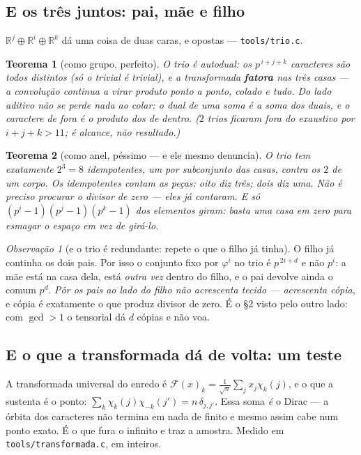 \documentclass[11pt]{article}
\newcommand{\code}[1]{\texttt{\small #1}}
\newcommand{\R}{\mathbb R}
\newcommand{\F}{\mathcal F}
\theoremstyle{plain}
\newtheorem{teorema}{Teorema}
\theoremstyle{remark}
\newtheorem{obs}{Observação}
\begin{document}
\subsection*{E os três juntos: pai, mãe e filho}

$\R^j\oplus\R^i\oplus\R^k$ dá uma coisa de duas caras, e opostas --- \code{tools/trio.c}.

\begin{teorema}[como grupo, perfeito]
O trio é autodual: os $p^{\,i+j+k}$ caracteres são todos distintos (só o trivial é trivial), e a
transformada \textbf{fatora} nas três casas --- a convolução continua a virar produto ponto a ponto,
colado e tudo. \emph{Do lado aditivo não se perde nada ao colar}: o dual de uma soma é a soma dos
duais, e o caractere de fora é o produto dos de dentro. ($2$ trios ficaram fora do exaustivo por
$i+j+k>11$; é alcance, não resultado.)
\end{teorema}

\begin{teorema}[como anel, péssimo --- e ele mesmo denuncia]
O trio tem exatamente $2^3=8$ idempotentes, um por subconjunto das casas, contra os $2$ de um corpo.
\emph{Os idempotentes contam as peças}: oito diz três; dois diz uma. Não é preciso procurar o divisor
de zero --- eles já contaram. E só $(p^i-1)(p^j-1)(p^k-1)$ dos elementos giram: basta \emph{uma} casa
em zero para esmagar o espaço em vez de girá-lo.
\end{teorema}

\begin{obs}[e o trio é redundante: repete o que o filho já tinha]
O filho já continha os dois pais. Por isso o conjunto fixo por $\varphi^i$ no trio é $p^{\,2i+d}$ e
não $p^i$: a mãe está na casa dela, está \emph{outra vez} dentro do filho, e o pai devolve ainda o
comum $p^d$. \emph{Pôr os pais ao lado do filho não acrescenta tecido --- acrescenta cópia}, e cópia é
exatamente o que produz divisor de zero. É o \S2 visto pelo outro lado: com $\gcd>1$ o tensorial dá
$d$ cópias e não voa.
\end{obs}

\subsection*{E o que a transformada dá de volta: um teste}

A transformada universal do enredo é $\F(x)_k=\frac1{\sqrt n}\sum_j x_j\chi_k(j)$, e o que a sustenta
é o ponto: $\sum_k\chi_k(j)\chi_{-k}(j')=n\,\delta_{j,j'}$. Essa soma \emph{é} o Dirac --- a órbita
dos caracteres não termina em nada de finito e mesmo assim cabe num ponto exato. É o que fura o
infinito e traz a amostra. Medido em \code{tools/transformada.c}, em inteiros.
\end{document}
